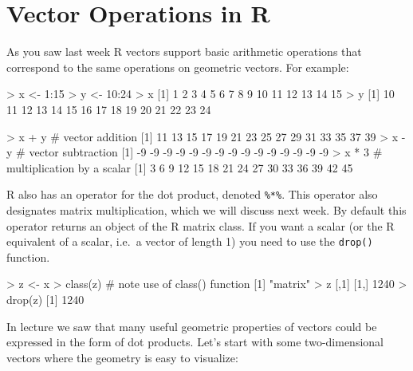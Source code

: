 
\section{Vector Operations in R}

As you saw last week R vectors support basic arithmetic operations that
correspond to the same operations on geometric vectors. For example:
%
\begin{R}
> x <- 1:15
> y <- 10:24
> x
 [1]  1  2  3  4  5  6  7  8  9 10 11 12 13 14 15
> y
 [1] 10 11 12 13 14 15 16 17 18 19 20 21 22 23 24

> x + y             # vector addition
 [1] 11 13 15 17 19 21 23 25 27 29 31 33 35 37 39
> x - y             # vector subtraction
 [1] -9 -9 -9 -9 -9 -9 -9 -9 -9 -9 -9 -9 -9 -9 -9
> x * 3             # multiplication by a scalar
 [1]  3  6  9 12 15 18 21 24 27 30 33 36 39 42 45 
\end{R}
%
R also has an operator for the dot product, denoted \lstinline!%*%!.
This operator also designates matrix multiplication, which we will
discuss next week. By default this operator returns an object of the R
matrix class. If you want a scalar (or the R equivalent of a scalar,
i.e.~a vector of length 1) you need to use the \lstinline!drop()!
function.

\begin{R}
> z <- x %
> class(z)      # note use of class() function
[1] "matrix"
> z
     [,1]
[1,] 1240
> drop(z)
[1] 1240
\end{R}

In lecture we saw that many useful geometric properties of vectors could be expressed in the form of dot products. Let's start with some two-dimensional vectors where the geometry is  easy to visualize:

